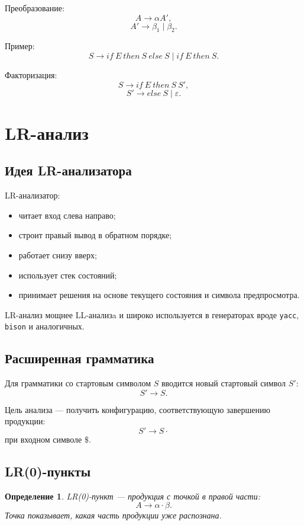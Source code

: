 \documentclass[12pt,a4paper]{article}
\newtheorem{definition}{Определение}
\begin{document}
Преобразование:
\[
A \to \alpha A',
\]
\[
A' \to \beta_1 \mid \beta_2.
\]

Пример:
\[
S \to if\ E\ then\ S\ else\ S
\mid if\ E\ then\ S.
\]

Факторизация:
\[
S \to if\ E\ then\ S\ S',
\]
\[
S' \to else\ S \mid \varepsilon.
\]

\section{LR-анализ}

\subsection{Идея LR-анализатора}

LR-анализатор:
\begin{itemize}
    \item читает вход слева направо;
    \item строит правый вывод в обратном порядке;
    \item работает снизу вверх;
    \item использует стек состояний;
    \item принимает решения на основе текущего состояния и символа предпросмотра.
\end{itemize}

LR-анализ мощнее LL-анализa и широко используется в генераторах вроде \texttt{yacc}, \texttt{bison} и аналогичных.

\subsection{Расширенная грамматика}

Для грамматики со стартовым символом $S$ вводится новый стартовый символ $S'$:
\[
S' \to S.
\]

Цель анализа --- получить конфигурацию, соответствующую завершению продукции:
\[
S' \to S \cdot
\]
при входном символе $\$$.

\subsection{LR(0)-пункты}

\begin{definition}
LR(0)-пункт --- продукция с точкой в правой части:
\[
A \to \alpha \cdot \beta.
\]
Точка показывает, какая часть продукции уже распознана.
\end{definition}
\end{document}
